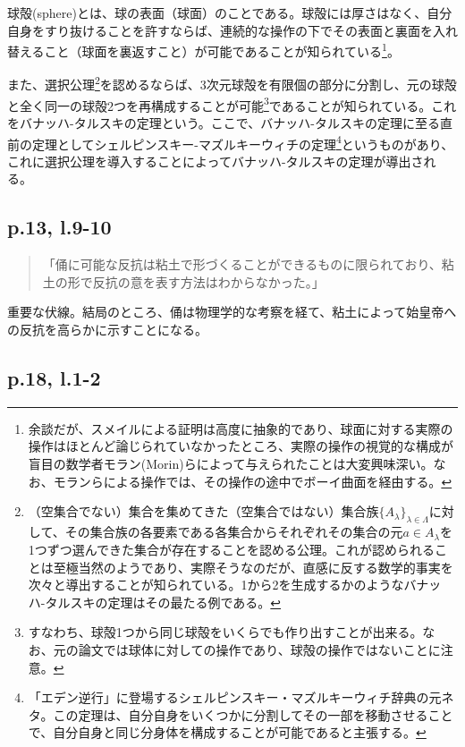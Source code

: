 \documentclass[10pt, a5paper, twoside]{jsarticle}
\theoremstyle{definition}
\begin{document}
		球殻(sphere)とは、球の表面（球面）のことである。球殻には厚さはなく、自分自身をすり抜けることを許すならば、連続的な操作の下でその表面と裏面を入れ替えること（球面を裏返すこと）が可能であることが知られている\cite{smale}\footnote{余談だが、スメイルによる証明\cite{smale}は高度に抽象的であり、球面に対する実際の操作はほとんど論じられていなかったところ、実際の操作の視覚的な構成が盲目の数学者モラン(Morin)らによって与えられたことは大変興味深い。なお、モランらによる操作では、その操作の途中でボーイ曲面を経由する。}。

		また、選択公理\footnote{（空集合でない）集合を集めてきた（空集合ではない）集合族$ { \{ A_{\lambda} \} }_{\lambda \in \Lambda}$に対して、その集合族の各要素である各集合からそれぞれその集合の元$ a \in A_\lambda $を1つずつ選んできた集合が存在することを認める公理\cite{hara}。これが認められることは至極当然のようであり、実際そうなのだが、直感に反する数学的事実を次々と導出することが知られている。1から2を生成するかのようなバナッハ-タルスキの定理はその最たる例である。}を認めるならば、3次元球殻を有限個の部分に分割し、元の球殻と全く同一の球殻2つを再構成することが可能\footnote{すなわち、球殻1つから同じ球殻をいくらでも作り出すことが出来る。なお、元の論文\cite{bantar}では球体に対しての操作であり、球殻の操作ではないことに注意。}であることが知られている。これをバナッハ-タルスキの定理という。ここで、バナッハ-タルスキの定理に至る直前の定理としてシェルピンスキー-マズルキーウィチの定理\footnote{「エデン逆行」に登場するシェルピンスキー・マズルキーウィチ辞典の元ネタ。この定理は、自分自身をいくつかに分割してその一部を移動させることで、自分自身と同じ分身体を構成することが可能であると主張する。}というものがあり、これに選択公理を導入することによってバナッハ-タルスキの定理が導出される\cite{math}。

		\subsection{p.13, l.9-10}\label{eisei1}

		\begin{quote}

			「俑に可能な反抗は粘土で形づくることができるものに限られており、粘土の形で反抗の意を表す方法はわからなかった。」

		\end{quote}

		重要な伏線。結局のところ、俑は物理学的な考察を経て、粘土によって始皇帝への反抗を高らかに示すことになる。

		\subsection{p.18, l.1-2}
\end{document}
